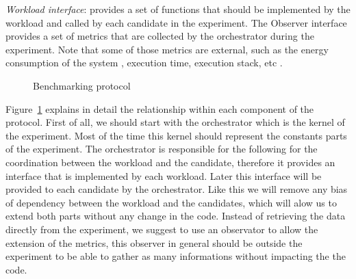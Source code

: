 \emph{Workload interface}: provides a set of functions that should be implemented by the workload and called by each candidate in the experiment.
The Observer interface provides a set of metrics that are collected by the orchestrator during the experiment. Note that some of those metrics are external, such as the energy consumption of the system , execution time, execution stack, etc .
\begin{figure}[!htb]
    \caption{Benchmarking protocol}\label{fig:benchmarkingprotocol}
\end{figure}
Figure~\ref{fig:benchmarkingprotocol} explains in detail the relationship within each component of the protocol.
First of all, we should start with the orchestrator which is the kernel of the experiment. Most of the time this kernel should represent the constants parts of the experiment.
The orchestrator is responsible for the following  for the coordination between the workload and the candidate, therefore it provides an interface that is implemented by each workload.
Later this interface will be provided to each candidate by the orchestrator. Like this we will remove any bias of dependency between the workload and the candidates, which will alow us to extend both parts without any change in the code.
Instead of retrieving the data directly from the experiment, we suggest to use an observator to allow the extension of the metrics, this observer in general should be outside the experiment to be able to gather as many informations without impacting the the code.




